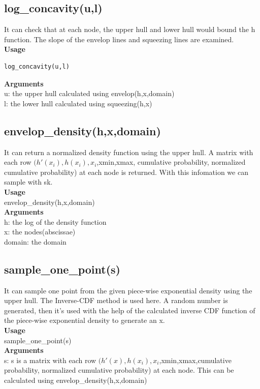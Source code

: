 \documentclass{llncs}\usepackage[]{graphicx}\usepackage[]{color}
\begin{document}
\subsection{log\_concavity(u,l)}
It can check that at each node, the upper hull and lower hull would bound the h function. The slope of the envelop lines and squeezing lines are examined.\\
\textbf{Usage}\\
\begin{verbatim}
log_concavity(u,l)
\end{verbatim}
\textbf{Arguments}\\
u: the upper hull calculated using envelop(h,x,domain)\\
l: the lower hull calculated using squeezing(h,x)\\
\subsection{envelop\_density(h,x,domain)}
It can return a normalized density function using the upper hull. A matrix with each row $(h'(x_i), h(x_i),x_i$,xmin,xmax,
cumulative probability, normalized cumulative probability) at each node is returned. With this infomation we can sample with sk.\\
\textbf{Usage}\\
envelop\_density(h,x,domain)\\
\textbf{Arguments}\\
h: the log of the density function\\
x: the nodes(abscissae)\\
domain: the domain
\subsection{sample\_one\_point(s)}
It can sample one point from the given piece-wise exponential density using the upper hull. The Inverse-CDF method is used here. A random number is generated, then it's used with the help of the calculated inverse CDF function of the piece-wise exponential density to generate an x.\\
\textbf{Usage}\\
sample\_one\_point(s)\\
\textbf{Arguments}\\
s: s is a matrix with each row $(h'(x), h(x_i),x_i$,xmin,xmax,cumulative
probability, normalized cumulative probability) at each node. This can be calculated using envelop\_density(h,x,domain)\\
\end{document}
